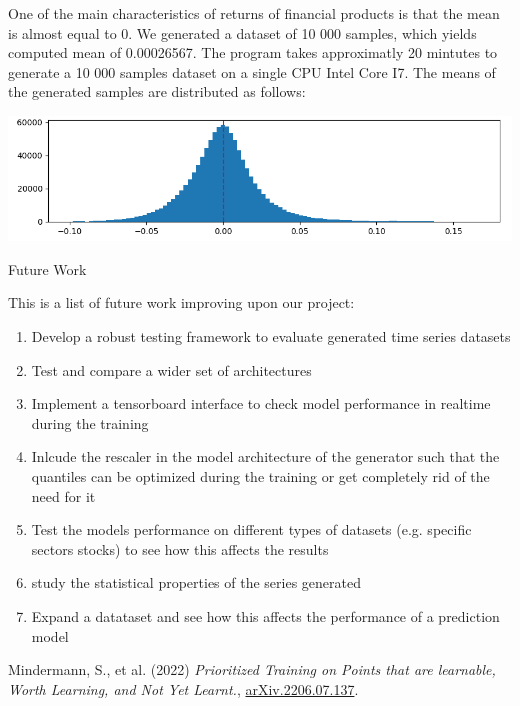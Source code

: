 \documentclass{article}
\begin{document}
    One of the main characteristics of returns of financial products is that the mean is almost equal to 0.
    We generated a dataset of 10 000 samples, which yields computed mean of 0.00026567.
    The program takes approximatly 20 mintutes to generate a 10 000 samples dataset on a single CPU Intel Core I7. The means of the generated samples are distributed as follows:
    \begin{center}
        \includegraphics[scale=0.75]{imgs/riccardo/generated.png}
    \end{center}
    
    \newpage
    \begin{center}
        {\huge{Future Work}}
    \end{center} 
    This is a list of future work improving upon our project:
    \begin{enumerate}
        \item Develop a robust testing framework to evaluate generated time series datasets
        \item Test and compare a wider set of architectures
        \item Implement a tensorboard interface to check model performance in realtime during the training
        \item Inlcude the rescaler in the model architecture of the generator such that the quantiles can be optimized during the training or get completely rid of the need for it
        \item Test the models performance on different types of datasets (e.g. specific sectors stocks) to see how this affects the results
        \item study the statistical properties of the series generated
        \item Expand a datataset and see how this affects the performance of a prediction model
    \end{enumerate}

    
    \begin{thebibliography}{9}
        Mindermann, S., et al. (2022) \emph{Prioritized Training on Points that are learnable, Worth Learning, and Not Yet Learnt.}, \href{https://doi.org/10.48550/arXiv.2206.07137}{arXiv.2206.07.137}.
        
        \bibitem{}
        \end{thebibliography}
\end{document}
